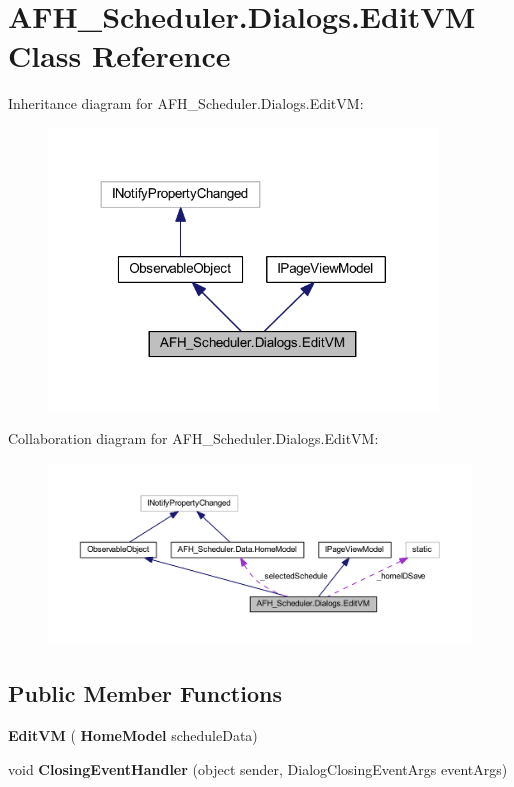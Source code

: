 \section{A\+F\+H\+\_\+\+Scheduler.\+Dialogs.\+Edit\+VM Class Reference}
\label{class_a_f_h___scheduler_1_1_dialogs_1_1_edit_v_m}


Inheritance diagram for A\+F\+H\+\_\+\+Scheduler.\+Dialogs.\+Edit\+VM\+:
\nopagebreak
\begin{figure}[H]
\begin{center}
\leavevmode
\includegraphics[width=293pt]{class_a_f_h___scheduler_1_1_dialogs_1_1_edit_v_m__inherit__graph}
\end{center}
\end{figure}


Collaboration diagram for A\+F\+H\+\_\+\+Scheduler.\+Dialogs.\+Edit\+VM\+:
\nopagebreak
\begin{figure}[H]
\begin{center}
\leavevmode
\includegraphics[width=350pt]{class_a_f_h___scheduler_1_1_dialogs_1_1_edit_v_m__coll__graph}
\end{center}
\end{figure}
\subsection*{Public Member Functions}
\begin{DoxyCompactItemize}
\item 
\textbf{ Edit\+VM} (\textbf{ Home\+Model} schedule\+Data)
\item 
void \textbf{ Closing\+Event\+Handler} (object sender, Dialog\+Closing\+Event\+Args event\+Args)
\end{DoxyCompactItemize}

